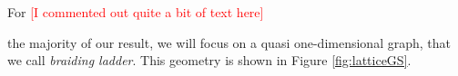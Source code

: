 \documentclass[two column]{article}
\newcommand{\caro}[1]{\textcolor{red}{[#1]}}
\newcommand{\jovan}[1]{\textcolor{blue}{[#1]}}
\begin{document}
For
\caro{I commented out quite a bit of text here}
%
%
%

%
the majority of our result, we will focus on a quasi one-dimensional graph, that we call \emph{braiding ladder}. 
This geometry is shown in Figure \ref{fig:latticeGS}. 
\end{document}
